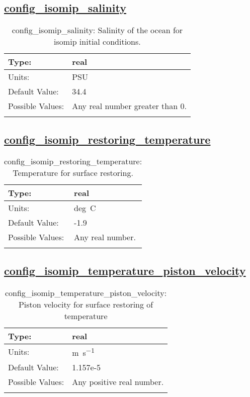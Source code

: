 \subsection[config\_isomip\_salinity]{\hyperref[sec:nm_tab_isomip]{config\_isomip\_salinity}}
\label{subsec:nm_sec_config_isomip_salinity}
\begin{center}
\begin{longtable}{| p{2.0in} || p{4.0in} |}
    \hline
    Type: & real \\
    \hline
    Units: & \si{PSU} \\
    \hline
    Default Value: & 34.4 \\
    \hline
    Possible Values: & Any real number greater than 0. \\
    \hline
    \caption{config\_isomip\_salinity: Salinity of the ocean for isomip initial conditions.}
\end{longtable}
\end{center}
\subsection[config\_isomip\_restoring\_temperature]{\hyperref[sec:nm_tab_isomip]{config\_isomip\_restoring\_temperature}}
\label{subsec:nm_sec_config_isomip_restoring_temperature}
\begin{center}
\begin{longtable}{| p{2.0in} || p{4.0in} |}
    \hline
    Type: & real \\
    \hline
    Units: & \si{deg.C} \\
    \hline
    Default Value: & -1.9 \\
    \hline
    Possible Values: & Any real number. \\
    \hline
    \caption{config\_isomip\_restoring\_temperature: Temperature for surface restoring.}
\end{longtable}
\end{center}
\subsection[config\_isomip\_temperature\_piston\_velocity]{\hyperref[sec:nm_tab_isomip]{config\_isomip\_temperature\_piston\_velocity}}
\label{subsec:nm_sec_config_isomip_temperature_piston_velocity}
\begin{center}
\begin{longtable}{| p{2.0in} || p{4.0in} |}
    \hline
    Type: & real \\
    \hline
    Units: & \si{m.s^{-1}} \\
    \hline
    Default Value: & 1.157e-5 \\
    \hline
    Possible Values: & Any positive real number. \\
    \hline
    \caption{config\_isomip\_temperature\_piston\_velocity: Piston velocity for surface restoring of temperature}
\end{longtable}
\end{center}
